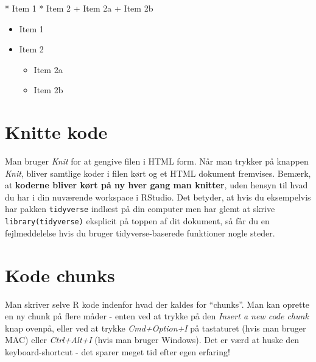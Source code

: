 \documentclass[
]{book}
\newenvironment{Shaded}{\begin{snugshade}}{\end{snugshade}}
\newcommand{\DecValTok}[1]{\textcolor[rgb]{0.00,0.00,0.81}{#1}}
\newcommand{\NormalTok}[1]{#1}
\newcommand{\SpecialCharTok}[1]{\textcolor[rgb]{0.00,0.00,0.00}{#1}}
\providecommand{\tightlist}{%
  \setlength{\itemsep}{0pt}\setlength{\parskip}{0pt}}
\begin{document}
\begin{Shaded}
\begin{Highlighting}[]
\SpecialCharTok{*}\NormalTok{ Item }\DecValTok{1}
\SpecialCharTok{*}\NormalTok{ Item }\DecValTok{2}
    \SpecialCharTok{+}\NormalTok{ Item 2a}
    \SpecialCharTok{+}\NormalTok{ Item 2b}
\end{Highlighting}
\end{Shaded}

\begin{itemize}
\tightlist
\item
  Item 1
\item
  Item 2

  \begin{itemize}
  \tightlist
  \item
    Item 2a
  \item
    Item 2b
  \end{itemize}
\end{itemize}

\hypertarget{knitte-kode}{%
\section{Knitte kode}\label{knitte-kode}}

Man bruger \emph{Knit} for at gengive filen i HTML form. Når man trykker på knappen \emph{Knit}, bliver samtlige koder i filen kørt og et HTML dokument fremvises. Bemærk, at \textbf{koderne bliver kørt på ny hver gang man knitter}, uden hensyn til hvad du har i din nuværende workspace i RStudio. Det betyder, at hvis du eksempelvis har pakken \texttt{tidyverse} indlæst på din computer men har glemt at skrive \texttt{library(tidyverse)} eksplicit på toppen af dit dokument, så får du en fejlmeddelelse hvis du bruger tidyverse-baserede funktioner nogle steder.

\hypertarget{kode-chunks}{%
\section{Kode chunks}\label{kode-chunks}}

Man skriver selve R kode indenfor hvad der kaldes for ``chunks''. Man kan oprette en ny chunk på flere måder - enten ved at trykke på den \emph{Insert a new code chunk} knap ovenpå, eller ved at trykke \emph{Cmd+Option+I} på tastaturet (hvis man bruger MAC) eller \emph{Ctrl+Alt+I} (hvis man bruger Windows). Det er værd at huske den keyboard-shortcut - det sparer meget tid efter egen erfaring!
\end{document}

